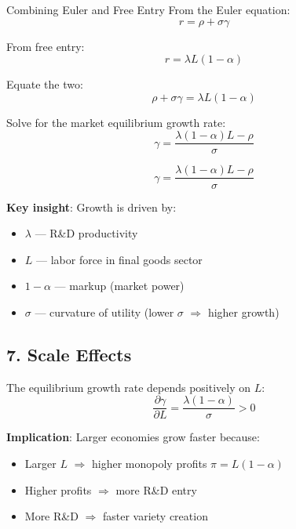 \documentclass[a4paper,11pt]{article}
\begin{document}
\bigskip
\begin{derivationbox}{Combining Euler and Free Entry}
From the Euler equation:
\[
r = \rho + \sigma\gamma
\tag{Euler with Growth}
\]

From free entry:
\[
r = \lambda L (1-\alpha)
\tag{Free Entry}
\]

Equate the two:
\[
\rho + \sigma\gamma = \lambda L (1-\alpha)
\]

Solve for the market equilibrium growth rate:
\[
\boxed{\gamma = \frac{\lambda(1-\alpha)L - \rho}{\sigma}}
\tag{Romer Market Growth}
\]
\end{derivationbox}

\begin{resultbox}
\[
\boxed{\gamma = \frac{\lambda(1-\alpha)L - \rho}{\sigma}}
\]

\bigskip
\noindent \textbf{Key insight}: Growth is driven by:
\begin{itemize}
    \item $\lambda$ --- R\&D productivity
    \item $L$ --- labor force in final goods sector
    \item $1-\alpha$ --- markup (market power)
    \item $\sigma$ --- curvature of utility (lower $\sigma$ $\Rightarrow$ higher growth)
\end{itemize}
\end{resultbox}

\subsection*{7. Scale Effects}

\bigskip
\begin{tcolorbox}[colback=red!10,colframe=red!60,title=Scale Effects in Romer Model]
The equilibrium growth rate depends positively on $L$:
\[
\frac{\partial \gamma}{\partial L} = \frac{\lambda(1-\alpha)}{\sigma} > 0
\]

\bigskip
\textbf{Implication}: Larger economies grow faster because:
\begin{itemize}
    \item Larger $L$ $\Rightarrow$ higher monopoly profits $\pi = L(1-\alpha)$
    \item Higher profits $\Rightarrow$ more R\&D entry
    \item More R\&D $\Rightarrow$ faster variety creation
\end{itemize}
\end{tcolorbox}
\end{document}
